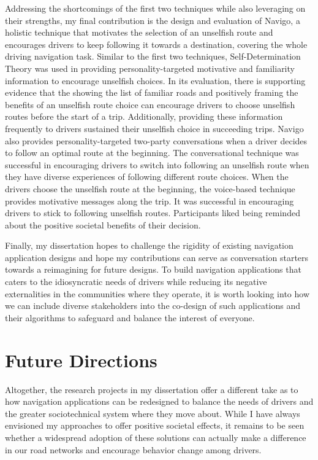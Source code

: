 Addressing the shortcomings of the first two techniques while also leveraging on their strengths, my final contribution is the design and evaluation of Navigo, a holistic technique that motivates the selection of an unselfish route and encourages drivers to keep following it towards a destination, covering the whole driving navigation task. Similar to the first two techniques, Self-Determination Theory was used in providing personality-targeted motivative and familiarity information to encourage unselfish choices. In its evaluation, there is  supporting evidence that the showing the list of familiar roads and positively framing the benefits of an unselfish route choice can encourage drivers to choose unselfish routes before the start of a trip. Additionally, providing these information frequently to drivers sustained their unselfish choice in succeeding trips. Navigo also provides personality-targeted two-party conversations when a driver decides to follow an optimal route at the beginning. The conversational technique was successful in encouraging drivers to switch into following an unselfish route when they have diverse experiences of following different route choices. When the drivers choose the unselfish route at the beginning, the voice-based technique provides motivative messages along the trip. It was successful in encouraging drivers to stick to following unselfish routes. Participants liked being reminded about the positive societal benefits of their decision.

Finally, my dissertation hopes to challenge the rigidity of existing navigation application designs and hope my contributions can serve as conversation starters towards a reimagining for future designs. To build navigation applications that caters to the idiosyncratic needs of drivers while reducing its negative externalities in the communities where they operate, it is worth looking into how we can include diverse stakeholders into the co-design of such applications and their algorithms to safeguard and balance the interest of everyone.

\section{Future Directions}

Altogether, the research projects in my dissertation offer a different take as to how navigation applications can be redesigned to balance the needs of drivers and the greater sociotechnical system where they move about. While I have always envisioned my approaches to offer positive societal effects, it remains to be seen whether a widespread adoption of these solutions can actually make a difference in our road networks and encourage behavior change among drivers.

